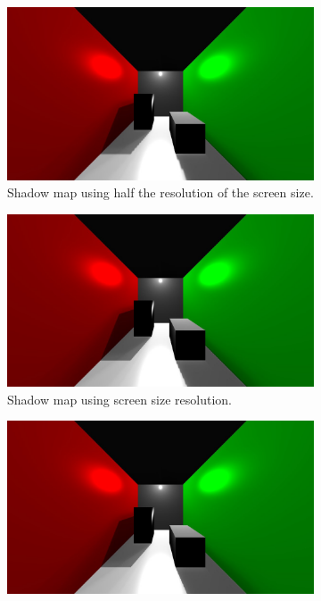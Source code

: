 \begin{figure}
        \centering
        \begin{subfigure}[b]{1.0\textwidth}
                \includegraphics[width=\textwidth]{AltResults/05SM.jpg}
                \caption{Shadow map using half the resolution of the screen size.}
        \end{subfigure}
        \centering
        \begin{subfigure}[b]{1.0\textwidth}
                \includegraphics[width=\textwidth]{AltResults/1SM.jpg}
                \caption{Shadow map using screen size resolution.}
        \end{subfigure}
        \centering
        \begin{subfigure}[b]{1.0\textwidth}
        		\includegraphics[width=\textwidth]{AltResults/2SM.jpg}

\end{subfigure}
\end{figure}
